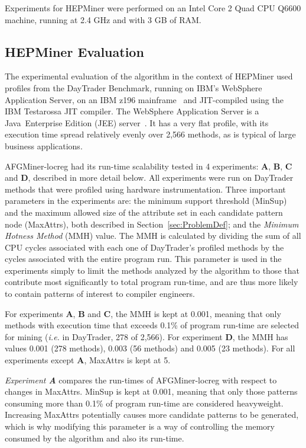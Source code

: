 Experiments for HEPMiner were performed on an Intel Core 2 Quad CPU Q6600 machine, running at 2.4 GHz and with 3 GB of RAM.

\subsection{HEPMiner Evaluation}
The experimental evaluation of the algorithm in the context of HEPMiner used profiles from the DayTrader Benchmark, running on IBM's WebSphere Application Server, on an IBM z196 mainframe~\cite{zEnterprise} and JIT-compiled using the IBM Testarossa JIT compiler. The WebSphere Application Server is a Java\textregistered~Enterprise Edition (JEE) server~\cite{WAS}. It has a very flat profile, with its execution time spread relatively evenly over 2,566 methods, as is typical of large business applications.

AFGMiner-locreg had its run-time scalability tested in 4 experiments: {\bf A}, {\bf B}, {\bf C} and {\bf D}, described in more detail below. All experiments were run on DayTrader methods that were profiled using hardware instrumentation. Three important parameters in the experiments are: the minimum support threshold (MinSup) and the maximum allowed size of the attribute set in each candidate pattern node (MaxAttrs), both described in Section~\ref{sec:ProblemDef}; and the \emph{Minimum Hotness Method} (MMH) value. The MMH is calculated by dividing the sum of all CPU cycles associated with each one of DayTrader's profiled methods by the cycles associated with the entire program run. This parameter is used in the experiments simply to limit the methods analyzed by the algorithm to those that contribute most significantly to total program run-time, and are thus more likely to contain patterns of interest to compiler engineers. 

For experiments {\bf A}, {\bf B} and {\bf C}, the MMH is kept at 0.001, meaning that only methods with execution time that exceeds 0.1\% of program run-time are selected for mining (\emph{i.e.} in DayTrader, 278 of 2,566). For experiment {\bf D}, the MMH has values 0.001 (278 methods), 0.003 (56 methods) and 0.005 (23 methods). For all experiments except {\bf A}, MaxAttrs is kept at 5.

\emph{Experiment {\bf A}} compares the run-times of AFGMiner-locreg with respect to changes in MaxAttrs. MinSup is kept at 0.001, meaning that only those patterns consuming more than 0.1\% of program run-time are considered heavyweight. Increasing MaxAttrs potentially causes more candidate patterns to be generated, which is why modifying this parameter is a way of controlling the memory consumed by the algorithm and also its run-time. 

